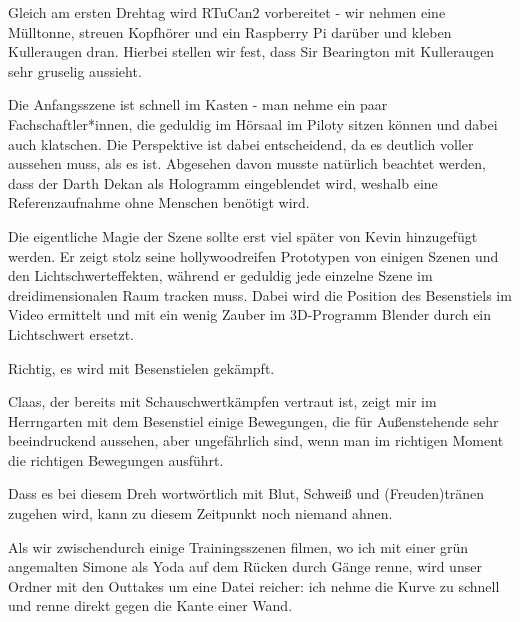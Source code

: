 {    %


    Gleich am ersten Drehtag wird RTuCan2 vorbereitet - wir nehmen eine Mülltonne,
    streuen Kopfhörer und ein Raspberry Pi darüber und kleben Kulleraugen dran.
    Hierbei stellen wir fest, dass Sir Bearington mit Kulleraugen
    sehr gruselig aussieht.



    Die Anfangsszene ist schnell im Kasten - man nehme ein paar Fachschaftler*innen, die
    geduldig im
    Hörsaal im Piloty sitzen können und dabei auch klatschen. Die Perspektive ist
    dabei entscheidend, da es deutlich voller aussehen muss, als es ist. Abgesehen
    davon musste natürlich beachtet werden, dass der Darth Dekan als Hologramm
    eingeblendet wird, weshalb eine Referenzaufnahme ohne Menschen benötigt
    wird.



    Die eigentliche Magie der Szene sollte erst viel später von Kevin hinzugefügt
    werden. Er zeigt stolz seine hollywoodreifen Prototypen von einigen Szenen und
    den Lichtschwerteffekten, während er geduldig jede einzelne Szene im
    dreidimensionalen Raum tracken muss. Dabei wird die Position des Besenstiels
    im Video ermittelt und mit ein wenig Zauber im 3D-Programm Blender durch ein
    Lichtschwert ersetzt.


    Richtig, es wird mit Besenstielen gekämpft.


    Claas, der bereits mit Schauschwertkämpfen vertraut ist, zeigt mir im
    Herrngarten mit dem Besenstiel einige Bewegungen, die für Außenstehende sehr
    beeindruckend aussehen, aber ungefährlich sind, wenn man im richtigen Moment
    die richtigen Bewegungen ausführt.


    Dass es bei diesem Dreh wortwörtlich mit Blut, Schweiß und (Freuden)tränen zugehen
    wird, kann zu diesem Zeitpunkt noch niemand ahnen.

    Als wir zwischendurch
    einige Trainingsszenen filmen, wo ich mit einer grün angemalten Simone als Yoda
    auf dem Rücken durch Gänge renne, wird unser Ordner mit den Outtakes um eine
    Datei reicher: ich nehme die Kurve zu schnell und renne direkt gegen die Kante
    einer Wand.


}
